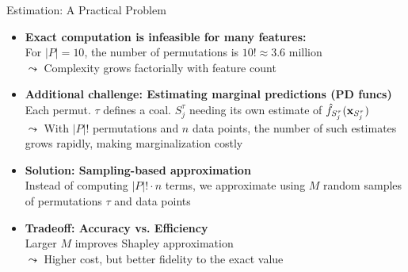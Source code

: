 \documentclass[10pt,compress,t,notes=noshow, xcolor=table]{beamer}
\newcommand{\Stau}{S_{j}^\tau}%
\begin{document}
\begin{frame}{Estimation: A Practical Problem}
\begin{itemize}[<+->]
  \item \textbf{Exact computation is infeasible for many features:}\\
        For $|P| = 10$, the number of permutations is $10! \approx 3.6$ million\\
        $\leadsto$ Complexity grows factorially with feature count

\item \textbf{Additional challenge: Estimating marginal predictions (PD funcs)}\\
Each permut. $\tau$ defines a coal. $\Stau$ needing its own estimate of $\fh_{\Stau}(\xv_{\Stau})$\\
$\leadsto$ With $|P|!$ permutations and $n$ data points, the number of such estimates grows rapidly, making marginalization costly


  \item \textbf{Solution: Sampling-based approximation}\\
        Instead of computing $|P|! \cdot n$ terms, we approximate using $M$ random samples of permutations $\tau$ and data points

  \item \textbf{Tradeoff: Accuracy vs. Efficiency}\\
        Larger $M$ improves Shapley approximation\\
        $\leadsto$ Higher cost, but better fidelity to the exact value
\end{itemize}
\end{frame}


\newcommand{\xk}{\mathbf{x}^{(k)}}
\end{document}
